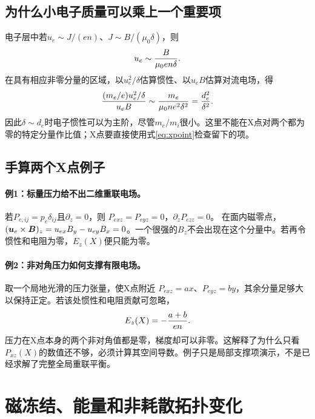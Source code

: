 \documentclass[UTF8,a4paper,11pt,openany,fontset=fandol]{ctexbook}
\begin{document}
\subsection{为什么小电子质量可以乘上一个重要项}
电子层中若$u_e\sim J/(en)$、$J\sim B/(\mu_0\delta)$，则
\begin{equation}
 u_e\sim {B\over\mu_0en\delta}.
\end{equation}
在具有相应非零分量的区域，以$u_e^2/\delta$估算惯性、以$u_eB$估算对流电场，得
\begin{equation}
 { (m_e/e)u_e^2/\delta\over u_eB}
 \sim{m_e\over\mu_0ne^2\delta^2}
 ={d_e^2\over\delta^2}.
\end{equation}
因此$\delta\sim d_e$时电子惯性可以为主阶，尽管$m_e/m_i$很小。这里不能在X点对两个都为零的特定分量作比值；X点要直接使用式\eqref{eq:xpoint}检查留下的项。

\subsection{手算两个X点例子}
\paragraph{例1：标量压力给不出二维重联电场。}
若$P_{e,ij}=p_e\delta_{ij}$且$\partial_z=0$，则
$P_{exz}=P_{eyz}=0$，$\partial_zP_{ezz}=0$。
在面内磁零点，$(\bm{u}_e\times\bm{B})_z=u_{ex}B_y-u_{ey}B_x=0$。一个很强的$B_z$不会出现在这个分量中。若再令惯性和电阻为零，$E_z(X)$便只能为零。

\paragraph{例2：非对角压力如何支撑有限电场。}
取一个局地光滑的压力张量，使X点附近
$P_{exz}=a x$、$P_{eyz}=b y$，其余分量足够大以保持正定。若该处惯性和电阻贡献可忽略，
\begin{equation}
 E_z(X)=-{a+b\over en}.
\end{equation}
压力在X点本身的两个非对角值都是零，梯度却可以非零。这解释了为什么只看$P_{xz}(X)$的数值还不够，必须计算其空间导数。例子只是局部支撑项演示，不是已经求解了完整全局重联平衡。


\section{磁冻结、能量和非耗散拓扑变化}
\end{document}
